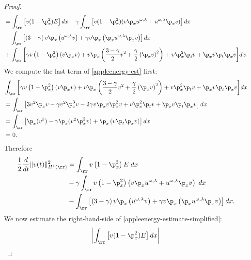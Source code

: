 \begin{proof}
\begin{equation}
\begin{split}
		& =  \int_{\rr} \left[ v(1-\p_x^2)E \right]dx
		- \gamma \int_{\rr} \left[ v(1-\p_x^2)(v\p_x u^{\omega,\lambda} + u^{\omega,\lambda} \p_x v) \right]dx
		\\
		&- \int_{\rr}\left[ \left( 3-\gamma \right)v \p_x\left( u^{\omega,\lambda}v \right) + \gamma v
		\p_x \left( \p_x u^{\omega,\lambda} \p_x v \right)\right]dx
		\\
		&+  \int_{\rr}
		\left[ \gamma v \left( 1-\p_x^2 \right)\left( v \p_x v \right) + v
		\p_x \left( \frac{3-\gamma}{2} v^2 + \frac{\gamma}{2}\left( \p_x v \right)^2
		\right) \right . +  v \p_x^2 \p_t v + \p_x v \p_t \p_x v\bigg]dx.
	\end{split}
\end{equation}
We compute the last term of \eqref{appleenergy-est} first:
\begin{equation*}
	\begin{split}
	&  \int_{\rr} \bigg[ \gamma v \left( 1-\p_x^2 \right)(v\p_x v) + v \p_x\left(
	\frac{3-\gamma}{2}v^2 + \frac{\gamma}{2}\left( \p_x v \right )^2 \right)
	+ v\p_x^2 \p_t v + \p_x v \p_t \p_x v
	\bigg]dx
	\\
	& =  \int_{\rr} \left[ 3v^2 \p_x v - \gamma v^2 \p_x^3 v - 2 \gamma v \p_x v \p_x^2
	v + v \p_x^2 \p_t v + \p_x v \p_t \p_x v \right]dx
	\\
	&=  \int_{\rr} \left[ \p_x (v^3) - \gamma \p_x (v^2 \p_x^2 v) + \p_x\left( v \p_t
	\p_x v
	\right) \right]dx
	\\
	& = 0.
\end{split}
\end{equation*}
Therefore			
\begin{equation}
	\label{appleenergy-estimate-simplified}
	\begin{split}
		\frac{1}{2}	\frac{d}{dt} \|v(t)\|_{H^1(\rr)}^2
		& =  \int_{\rr}
		 v\left( 1-\p_x^2
	\right)E \; dx
	\\
	&-  \gamma  \int_{\rr}  v\left( 1-\p_x^2 \right)\left( v \p_x u^{\omega,\lambda}
	+ u^{\omega,\lambda} \p_x v
	\right) \; dx
	\\
	& -  \int_{\rr} \left[ \left( 3-\gamma \right)v \p_x \left( u^{\omega,\lambda}v \right) + \gamma v
	\p_x \left( \p_x u^{\omega,\lambda} \p_x v \right)\right]dx.
\end{split}
\end{equation}
We now estimate the right-hand-side of \eqref{appleenergy-estimate-simplified}:
%
\begin{equation}
	\begin{split}
		\label{applefirst_piece}
	\left |\int_{\rr} \left [v (1- \p_x^2)E \right ] dx \right |

\end{split}
\end{equation}
\end{proof}
